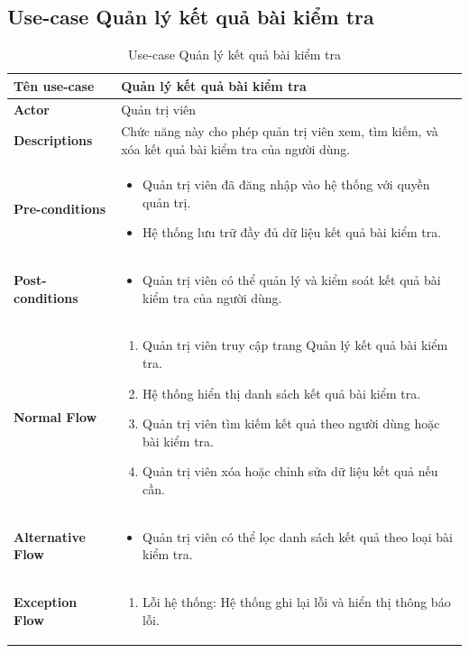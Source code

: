 \subsection{Use-case Quản lý kết quả bài kiểm tra}
\begin{longtable}[H]{|l|p{}|}
    \caption{Use-case Quản lý kết quả bài kiểm tra} \\
    \hline
    \textbf{Tên use-case} & Quản lý kết quả bài kiểm tra \\
    \hline
    \textbf{Actor} & Quản trị viên \\
    \hline
    \textbf{Descriptions} & Chức năng này cho phép quản trị viên xem, tìm kiếm, và xóa kết quả bài kiểm tra của người dùng. \\
    \hline
    \textbf{Pre-conditions} & 
    \begin{itemize}[leftmargin=4mm]
        \item Quản trị viên đã đăng nhập vào hệ thống với quyền quản trị.
        \item Hệ thống lưu trữ đầy đủ dữ liệu kết quả bài kiểm tra.
    \end{itemize} \\
    \hline
    \textbf{Post-conditions} & 
    \begin{itemize}[leftmargin=4mm]
        \item Quản trị viên có thể quản lý và kiểm soát kết quả bài kiểm tra của người dùng.
    \end{itemize} \\
    \hline
    \textbf{Normal Flow} &  
    \begin{enumerate}[leftmargin=5.5mm]
        \item Quản trị viên truy cập trang Quản lý kết quả bài kiểm tra.
        \item Hệ thống hiển thị danh sách kết quả bài kiểm tra.
        \item Quản trị viên tìm kiếm kết quả theo người dùng hoặc bài kiểm tra.
        \item Quản trị viên xóa hoặc chỉnh sửa dữ liệu kết quả nếu cần.
    \end{enumerate} \\
    \hline
    \textbf{Alternative Flow} & 
    \begin{itemize}[leftmargin=4mm]
        \item Quản trị viên có thể lọc danh sách kết quả theo loại bài kiểm tra.
    \end{itemize} \\
    \hline
    \textbf{Exception Flow} & 
    \begin{enumerate}[leftmargin=5.5mm]
        \item Lỗi hệ thống: Hệ thống ghi lại lỗi và hiển thị thông báo lỗi.
    \end{enumerate} \\
    \hline
\end{longtable}
